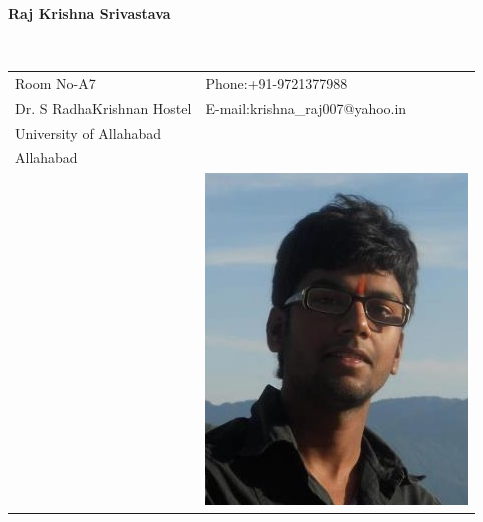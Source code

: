 \documentclass[12pt]{article}
\begin{document}
\vspace{0.5in}
\begin{center}\begin{large}\textbf{Raj Krishna Srivastava}\end{large}\end{center}\textbf{\hrulefill}\\

\begin{tabular}{@{}p{4in}p{3in}}
Room No-A7 & {Phone:}+91-9721377988 \\
Dr. S RadhaKrishnan Hostel & {E-mail:}krishna\_raj007@yahoo.in\\
University of Allahabad \\
Allahabad\\
& \includegraphics[scale=0.4]{rajKrishna.jpg}\\
\end{tabular}
\end{document}
